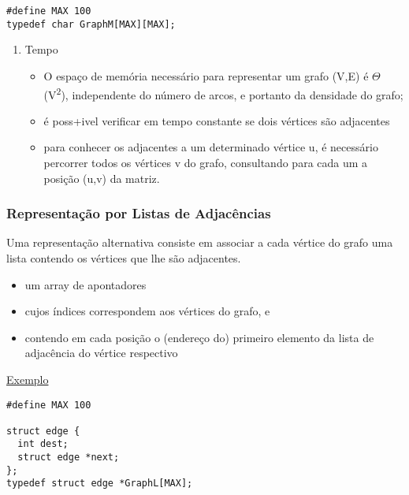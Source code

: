 \documentclass[11pt]{article}
\begin{document}
\begin{verbatim}
#define MAX 100
typedef char GraphM[MAX][MAX];
\end{verbatim}

\begin{enumerate}
\item Tempo
\label{sec:org77f358a}
\begin{itemize}
\item O espaço de memória necessário para representar um grafo (V,E) é \(\Theta\)(V\textsuperscript{2}),  independente do número de arcos, e portanto da densidade do grafo;
\item é poss+ivel verificar em tempo constante se dois vértices são adjacentes
\item para conhecer os  adjacentes a um determinado vértice u, é necessário percorrer todos os vértices v do grafo, consultando para cada um a posição (u,v) da matriz.
\end{itemize}
\end{enumerate}

\subsubsection{Representação por Listas de Adjacências}
\label{sec:org7bd8bf0}
Uma representação alternativa consiste em associar a cada vértice do grafo uma lista contendo os vértices que lhe são adjacentes.

\begin{itemize}
\item um array de apontadores
\item cujos índices correspondem aos vértices do grafo, e
\item contendo em cada posição o (endereço do) primeiro elemento da lista de adjacência do vértice respectivo
\end{itemize}

\href{./lista\_grafo.png}{Exemplo}

\begin{verbatim}
#define MAX 100

struct edge {
  int dest;
  struct edge *next;
};
typedef struct edge *GraphL[MAX];
\end{verbatim}
\end{document}
